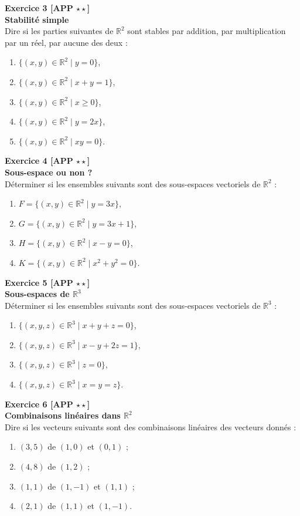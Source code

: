 \documentclass[11pt,a4paper]{article}
\begin{document}
\textbf{Exercice 3 [APP $\star\star$]}\\
\textbf{Stabilité simple}\\
Dire si les parties suivantes de $\mathbb{R}^2$ sont stables par addition, par multiplication par un réel, par aucune des deux :
\begin{enumerate}[label=\alph*)]
    \item $\{(x,y)\in\mathbb{R}^2\mid y=0\}$,
    \item $\{(x,y)\in\mathbb{R}^2\mid x+y=1\}$,
    \item $\{(x,y)\in\mathbb{R}^2\mid x\ge 0\}$,
    \item $\{(x,y)\in\mathbb{R}^2\mid y=2x\}$,
    \item $\{(x,y)\in\mathbb{R}^2\mid xy=0\}$.
\end{enumerate}

\textbf{Exercice 4 [APP $\star\star$]}\\
\textbf{Sous-espace ou non ?}\\
Déterminer si les ensembles suivants sont des sous-espaces vectoriels de $\mathbb{R}^2$ :
\begin{enumerate}[label=\alph*)]
    \item $F=\{(x,y)\in\mathbb{R}^2\mid y=3x\}$,
    \item $G=\{(x,y)\in\mathbb{R}^2\mid y=3x+1\}$,
    \item $H=\{(x,y)\in\mathbb{R}^2\mid x-y=0\}$,
    \item $K=\{(x,y)\in\mathbb{R}^2\mid x^2+y^2=0\}$.
\end{enumerate}

\textbf{Exercice 5 [APP $\star\star$]}\\
\textbf{Sous-espaces de $\mathbb{R}^3$}\\
Déterminer si les ensembles suivants sont des sous-espaces vectoriels de $\mathbb{R}^3$ :
\begin{enumerate}[label=\alph*)]
    \item $\{(x,y,z)\in\mathbb{R}^3\mid x+y+z=0\}$,
    \item $\{(x,y,z)\in\mathbb{R}^3\mid x-y+2z=1\}$,
    \item $\{(x,y,z)\in\mathbb{R}^3\mid z=0\}$,
    \item $\{(x,y,z)\in\mathbb{R}^3\mid x=y=z\}$.
\end{enumerate}

\textbf{Exercice 6 [APP $\star\star$]}\\
\textbf{Combinaisons linéaires dans $\mathbb{R}^2$}\\
Dire si les vecteurs suivants sont des combinaisons linéaires des vecteurs donnés :
\begin{enumerate}[label=\alph*)]
    \item $(3,5)$ de $(1,0)$ et $(0,1)$ ;
    \item $(4,8)$ de $(1,2)$ ;
    \item $(1,1)$ de $(1,-1)$ et $(1,1)$ ;
    \item $(2,1)$ de $(1,1)$ et $(1,-1)$.
\end{enumerate}
\end{document}
